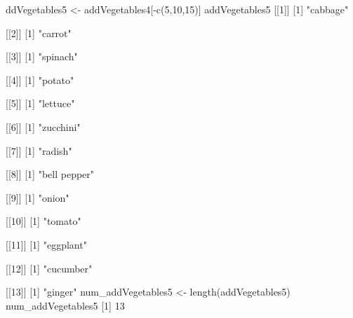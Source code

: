 \documentclass[
]{article}
\newenvironment{Shaded}{\begin{snugshade}}{\end{snugshade}}
\newcommand{\NormalTok}[1]{#1}
\begin{document}
\begin{Shaded}
\begin{Highlighting}[]
\NormalTok{ddVegetables5 \textless{}{-} addVegetables4[{-}c(5,10,15)]}
\NormalTok{addVegetables5 }
\NormalTok{[[1]]}
\NormalTok{[1] "cabbage"}

\NormalTok{[[2]]}
\NormalTok{[1] "carrot"}

\NormalTok{[[3]]}
\NormalTok{[1] "spinach"}

\NormalTok{[[4]]}
\NormalTok{[1] "potato"}

\NormalTok{[[5]]}
\NormalTok{[1] "lettuce"}

\NormalTok{[[6]]}
\NormalTok{[1] "zucchini"}

\NormalTok{[[7]]}
\NormalTok{[1] "radish"}

\NormalTok{[[8]]}
\NormalTok{[1] "bell pepper"}

\NormalTok{[[9]]}
\NormalTok{[1] "onion"}

\NormalTok{[[10]]}
\NormalTok{[1] "tomato"}

\NormalTok{[[11]]}
\NormalTok{[1] "eggplant"}

\NormalTok{[[12]]}
\NormalTok{[1] "cucumber"}

\NormalTok{[[13]]}
\NormalTok{[1] "ginger"}
\NormalTok{num\_addVegetables5 \textless{}{-} length(addVegetables5)}
\NormalTok{num\_addVegetables5 }
\NormalTok{[1] 13}
\end{Highlighting}
\end{Shaded}
\end{document}
